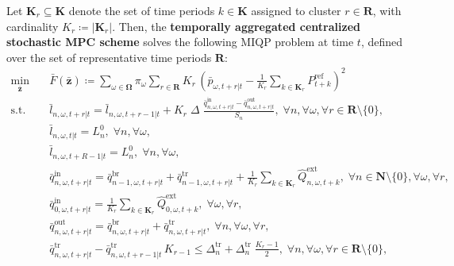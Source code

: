 \documentclass[10pt,a4paper]{amsart}
\begin{document}
Let $\boldsymbol{K}_r \subseteq \boldsymbol{K}$ denote the set of time periods $k \in \boldsymbol{K}$ assigned to cluster $r \in \boldsymbol{R}$,
with cardinality $K_r \coloneqq |\boldsymbol{K}_r|$.
Then, the \textbf{temporally aggregated centralized stochastic MPC scheme} solves the following MIQP problem at time $t$, defined over the set of representative time periods $\boldsymbol{R}$:
\begin{subequations}
\label{eq:TSA_cen_sto_MPC}
\begin{align}
\min_{\boldsymbol{\bar{z}}} \quad &
\bar{F}(\boldsymbol{\bar{z}}) \coloneqq
\sum_{\omega \in \boldsymbol{\Omega}} \pi_{\omega} \sum_{r \in \boldsymbol{R}} K_r \, \left( \bar{p}_{\omega, t+r|t} - \frac{1}{K_r} \sum_{k \in \boldsymbol{K}_r} P^{\mathrm{ref}}_{t+k} \right)^2 \label{eq:TSA_cen_sto_obj}\\
\text{s.t.} \quad &
\bar{l}_{n, \omega, t+r | t} = \bar{l}_{n, \omega, t+r-1 | t} + K_r \; \Delta \; \frac{ \bar{q}^{\mathrm{in}}_{n, \omega, t+r | t} - \bar{q}^{\mathrm{out}}_{n, \omega, t+r | t}}{S_n}, \; \forall n, \forall \omega, \forall r \in \boldsymbol{R} \setminus \{0\},
\label{eq:TSA_cen_sto_water_level}\\
& \bar{l}_{n, \omega, t | t} = L^0_{n}, \; \forall n, \forall \omega,
\label{eq:TSA_cen_sto_water_level_init}\\
& \bar{l}_{n, \omega, t + R-1 | t} = L^0_{n}, \; \forall n, \forall \omega, \label{eq:TSA_cen_sto_water_level_final}\\
& \bar{q}^{\mathrm{in}}_{n, \omega, t+r | t} = \bar{q}^{\mathrm{br}}_{n-1, \omega, t+r | t} + \bar{q}^{\mathrm{tr}}_{n-1, \omega, t+r | t} + \frac{1}{K_r} \sum_{k \in \boldsymbol{K}_r} \hat{Q}^\mathrm{ext}_{n, \omega, t+k}, \; \forall n \in \boldsymbol{N} \setminus \{0\}, \forall \omega, \forall r,
\label{eq:TSA_cen_sto_inflow}\\
& \bar{q}^{\mathrm{in}}_{0, \omega, t+r | t} = \frac{1}{K_r} \sum_{k \in \boldsymbol{K}_r} \hat{Q}^\mathrm{ext}_{0, \omega, t+k}, \; \forall \omega, \forall r,
\label{eq:TSA_cen_sto_inflow_init}\\
& \bar{q}^{\mathrm{out}}_{n, \omega, t+r | t} = \bar{q}^{\mathrm{br}}_{n, \omega, t+r | t} + \bar{q}^{\mathrm{tr}}_{n, \omega, t+r | t}, \; \forall n, \forall \omega, \forall r,
\label{eq:TSA_cen_sto_outflow}\\
& \bar{q}^{\mathrm{tr}}_{n, \omega, t+r|t} - \bar{q}^{\mathrm{tr}}_{n, \omega, t+r-1|t} \, K_{r-1} \leq
\Delta^{\mathrm{tr}}_{n} + \Delta^{\mathrm{tr}}_{n} \; \frac{K_r - 1}{2}, \; \forall n, \forall \omega, \forall r \in \boldsymbol{R} \setminus \{0\}, 

\end{align}
\end{subequations}
\end{document}
